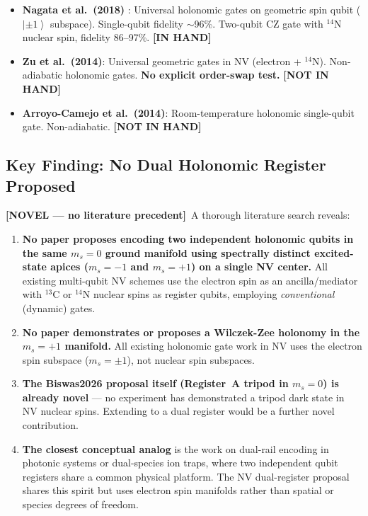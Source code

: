 \documentclass[11pt,letterpaper]{article}
\newcommand{\ket}[1]{\left|#1\right\rangle}
\newcommand{\needpaper}{\textcolor{red!70!black}{\textbf{[NOT IN HAND]}}}
\newcommand{\inhand}{\textcolor{green!50!black}{\textbf{[IN HAND]}}}
\newcommand{\novel}{\textcolor{purple!70!black}{\textbf{[NOVEL --- no literature precedent]}}}
\begin{document}
\begin{itemize}[leftmargin=*]
    \item \textbf{Nagata et al.\ (2018)} \cite{Nagata2018}: Universal holonomic gates on geometric spin qubit ($\ket{\pm 1}$ subspace). Single-qubit fidelity $\sim$96\%. Two-qubit CZ gate with $^{14}$N nuclear spin, fidelity 86--97\%. \inhand

    \item \textbf{Zu et al.\ (2014)}: Universal geometric gates in NV (electron + $^{14}$N). Non-adiabatic holonomic gates. \textbf{No explicit order-swap test.} \needpaper

    \item \textbf{Arroyo-Camejo et al.\ (2014)}: Room-temperature holonomic single-qubit gate. Non-adiabatic. \needpaper
\end{itemize}

\subsection{Key Finding: No Dual Holonomic Register Proposed}

\novel\ A thorough literature search reveals:
\begin{enumerate}[leftmargin=*]
    \item \textbf{No paper proposes encoding two independent holonomic qubits in the same $m_s = 0$ ground manifold using spectrally distinct excited-state apices ($m_s = -1$ and $m_s = +1$) on a single NV center.} All existing multi-qubit NV schemes use the electron spin as an ancilla/mediator with $^{13}$C or $^{14}$N nuclear spins as register qubits, employing \emph{conventional} (dynamic) gates.

    \item \textbf{No paper demonstrates or proposes a Wilczek-Zee holonomy in the $m_s = +1$ manifold.} All existing holonomic gate work in NV uses the electron spin subspace ($m_s = \pm 1$), not nuclear spin subspaces.

    \item \textbf{The Biswas2026 proposal itself (Register~A tripod in $m_s = 0$) is already novel} --- no experiment has demonstrated a tripod dark state in NV nuclear spins. Extending to a dual register would be a further novel contribution.

    \item \textbf{The closest conceptual analog} is the work on dual-rail encoding in photonic systems or dual-species ion traps, where two independent qubit registers share a common physical platform. The NV dual-register proposal shares this spirit but uses electron spin manifolds rather than spatial or species degrees of freedom.
\end{enumerate}
\end{document}
